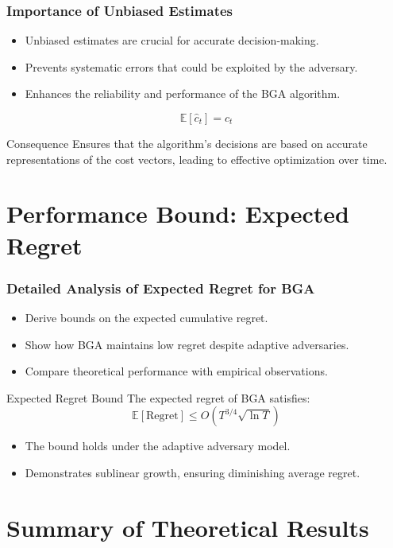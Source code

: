 \documentclass{beamer}
\begin{document}
\begin{frame}
\frametitle{Importance of Unbiased Estimates}
\begin{itemize}
    \item Unbiased estimates are crucial for accurate decision-making.
    \item Prevents systematic errors that could be exploited by the adversary.
    \item Enhances the reliability and performance of the BGA algorithm.
\end{itemize}
\begin{equation*}
    \mathbb{E}[\hat{c}_t] = c_t
\end{equation*}
\begin{block}{Consequence}
    Ensures that the algorithm's decisions are based on accurate representations of the cost vectors, leading to effective optimization over time.
\end{block}
\end{frame}

\section{Performance Bound: Expected Regret}

\begin{frame}
\frametitle{Detailed Analysis of Expected Regret for BGA}
\begin{itemize}
    \item Derive bounds on the expected cumulative regret.
    \item Show how BGA maintains low regret despite adaptive adversaries.
    \item Compare theoretical performance with empirical observations.
\end{itemize}
\begin{block}{Expected Regret Bound}
    The expected regret of BGA satisfies:
    \[
    \mathbb{E}[\text{Regret}] \leq O\left(T^{3/4} \sqrt{\ln T}\right)
    \]
    \begin{itemize}
        \item The bound holds under the adaptive adversary model.
        \item Demonstrates sublinear growth, ensuring diminishing average regret.
    \end{itemize}
\end{block}
\end{frame}

\section{Summary of Theoretical Results}
\end{document}

